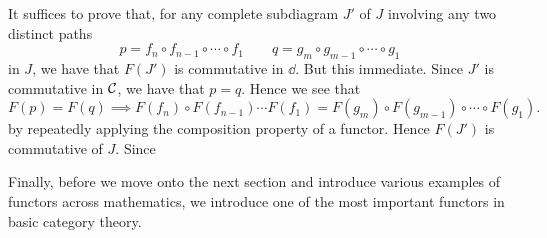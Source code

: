     \begin{prf}
        It suffices to prove that,
        for any complete subdiagram $J'$ of $J$ involving any 
        two distinct paths
        \[
            p = f_n \circ f_{n-1} \circ \cdots \circ f_1 \qquad q = g_m \circ g_{m-1} \circ \cdots \circ g_1
        \]
        in $J$, we have that $F(J')$ is commutative in $\dd$. But this immediate. 
        Since $J'$ is commutative in $\mathcal{C}$, we have that $p = q$. Hence 
        we see that 
        \[
            F(p) = F(q) \implies F(f_n) \circ F(f_{n-1}) \cdots F(f_1) = F(g_m) \circ F(g_{m-1}) \circ \cdots \circ F(g_1).
        \]
        by repeatedly applying the composition property of a functor.
        Hence $F(J')$ is commutative of $J$. Since 
    \end{prf}

    Finally, before we move onto the next section and introduce various examples of 
    functors across mathematics, we introduce one of the most important 
    functors in basic category theory. 

